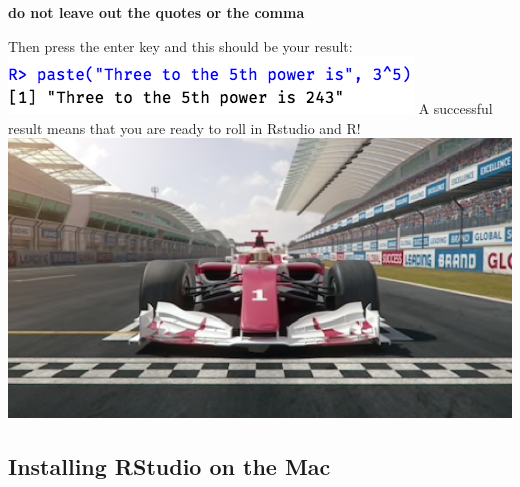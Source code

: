 \documentclass[
]{book}
\begin{document}
\textbf{do not leave out the quotes or the comma}

Then press the enter key
and this should be your result:
\includegraphics{images/test_result35.png}
A successful result means that you are ready to roll in Rstudio and R!
\includegraphics{images/ready_to_R.png}

\hypertarget{installing-rstudio-on-the-mac}{%
\subsection{Installing RStudio on the Mac}\label{installing-rstudio-on-the-mac}}
\end{document}
